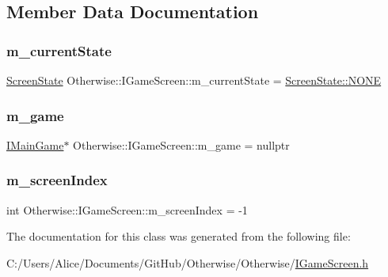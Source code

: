 \subsection{Member Data Documentation}
\mbox{\label{class_otherwise_1_1_i_game_screen_a4a0f49624a04c2a4a67cc6d23404f7a4}} 
\subsubsection{\texorpdfstring{m\+\_\+current\+State}{m\_currentState}}
{\footnotesize\ttfamily \hyperlink{namespace_otherwise_ab18c192ed63e79f9243b937d42c1fc7b}{Screen\+State} Otherwise\+::\+I\+Game\+Screen\+::m\+\_\+current\+State = \hyperlink{namespace_otherwise_ab18c192ed63e79f9243b937d42c1fc7bab50339a10e1de285ac99d4c3990b8693}{Screen\+State\+::\+N\+O\+NE}\hspace{0.3cm}{\ttfamily [protected]}}

\mbox{\label{class_otherwise_1_1_i_game_screen_aa0fcd866e31b74e406fbbb03e7f78640}} 
\subsubsection{\texorpdfstring{m\+\_\+game}{m\_game}}
{\footnotesize\ttfamily \hyperlink{class_otherwise_1_1_i_main_game}{I\+Main\+Game}$\ast$ Otherwise\+::\+I\+Game\+Screen\+::m\+\_\+game = nullptr\hspace{0.3cm}{\ttfamily [protected]}}

\mbox{\label{class_otherwise_1_1_i_game_screen_abbc431d58e99d00601ce75b3bedfbc3f}} 
\subsubsection{\texorpdfstring{m\+\_\+screen\+Index}{m\_screenIndex}}
{\footnotesize\ttfamily int Otherwise\+::\+I\+Game\+Screen\+::m\+\_\+screen\+Index = -\/1\hspace{0.3cm}{\ttfamily [protected]}}



The documentation for this class was generated from the following file\+:\begin{DoxyCompactItemize}
\item 
C\+:/\+Users/\+Alice/\+Documents/\+Git\+Hub/\+Otherwise/\+Otherwise/\hyperlink{_i_game_screen_8h}{I\+Game\+Screen.\+h}\end{DoxyCompactItemize}
